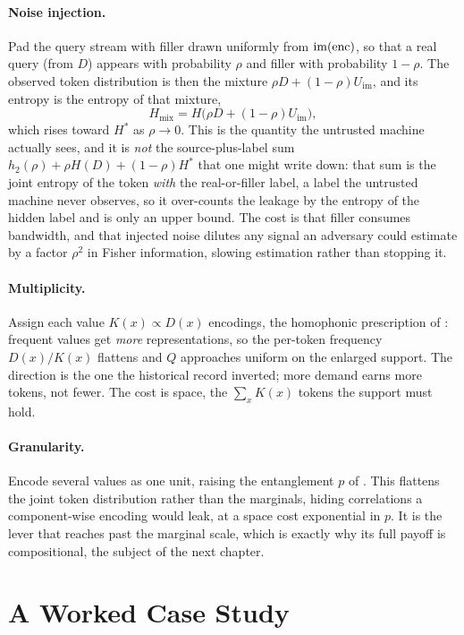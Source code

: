 \paragraph{Noise injection.}
Pad the query stream with filler drawn uniformly from $\mathrm{im}(\operatorname{enc})$, so
that a real query (from $D$) appears with probability $\rho$ and filler with
probability $1 - \rho$. The observed token distribution is then the mixture
$\rho D + (1 - \rho) U_{\mathrm{im}}$, and its entropy is the entropy of that
mixture,
\[
  H_{\mathrm{mix}} = H\bigl(\rho D + (1 - \rho) U_{\mathrm{im}}\bigr),
\]
which rises toward $H^{*}$ as $\rho \to 0$. This is the quantity the
untrusted machine actually sees, and it is \emph{not} the source-plus-label
sum $h_2(\rho) + \rho H(D) + (1-\rho) H^{*}$ that one might write down: that
sum is the joint entropy of the token \emph{with} the real-or-filler label,
a label the untrusted machine never observes, so it over-counts the leakage
by the entropy of the hidden label and is only an upper bound. The cost is
that filler consumes bandwidth, and that injected noise dilutes any
signal an adversary could estimate by a factor $\rho^{2}$ in Fisher
information, slowing estimation rather than stopping it.

\paragraph{Multiplicity.}
Assign each value $K(x) \propto D(x)$ encodings, the homophonic prescription
of : frequent values get \emph{more} representations, so
the per-token frequency $D(x)/K(x)$ flattens and $Q$ approaches uniform on
the enlarged support. The direction is the one the historical record
inverted; more demand earns more tokens, not fewer. The cost is space, the
$\sum_x K(x)$ tokens the support must hold.

\paragraph{Granularity.}
Encode several values as one unit, raising the entanglement $p$ of
. This flattens the joint token distribution rather
than the marginals, hiding correlations a component-wise encoding would leak,
at a space cost exponential in $p$. It is the lever that reaches past the
marginal scale, which is exactly why its full payoff is compositional, the
subject of the next chapter.

\section{A Worked Case Study}
\label{sec:case-study}

